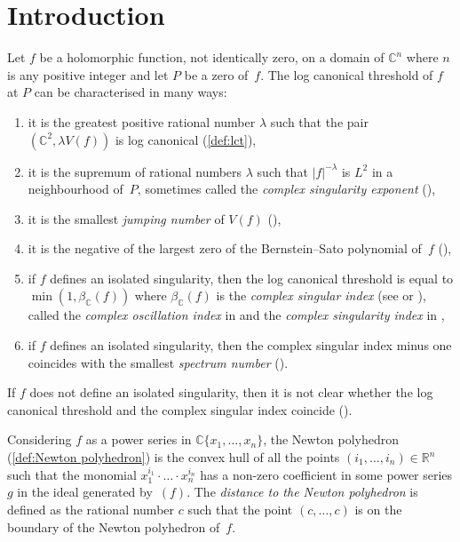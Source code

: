 \documentclass[a4paper, 12pt, oneside]{article}
\theoremstyle{plain}
\theoremstyle{definition}
\theoremstyle{remark}
\numberwithin{theorem}{section}
\numberwithin{table}{section}
\numberwithin{equation}{theorem}
\newcommand*\abs[1]{\left\lvert #1 \right\rvert}
\begin{document}
\section{Introduction}

Let $f$ be a holomorphic function, not identically zero, on a domain of $\mathbb C^n$ where $n$ is any positive integer and let $P$ be a zero of~$f$. The log canonical threshold of $f$ at $P$ can be characterised in many ways:
\begin{enumerate}[label=(\arabic*), ref=\arabic*]
\item it is the greatest positive rational number $\lambda$ such that the pair $(\mathbb C^2, \lambda V(f))$ is log canonical (\cref{def:lct}),
\item it is the supremum of rational numbers $\lambda$ such that $\abs{f}^{-\lambda}$ is $L^2$ in a neighbourhood of~$P$, sometimes called the \emph{complex singularity exponent} (\cite[Definition~8.4]{KK13}),
\item it is the smallest \emph{jumping number} of $V(f)$ (\cite[Definition~9.3.22]{Laz04b}),
\item it is the negative of the largest zero of the Bernstein--Sato polynomial of~$f$ (\cite[Theorem~10.6]{Kol97}),
\item if $f$ defines an isolated singularity, then the log canonical threshold is equal to $\min(1, \beta_\mathbb C(f))$ where $\beta_\mathbb C(f)$ is the \emph{complex singular index} (see \cite[Section~4]{Var82} or \cite[Theorem~9.5]{Kol97}), called the \emph{complex oscillation index} in \cite[13.1.5]{AGZV12b} and the \emph{complex singularity index} in \cite{Ste85},
\item if $f$ defines an isolated singularity, then the complex singular index minus one coincides with the smallest \emph{spectrum number} (\cite[p~558]{Ste85}).
\end{enumerate}
If $f$ does not define an isolated singularity, then it is not clear whether the log canonical threshold and the complex singular index coincide (\cite[9.6]{Kol97}).

Considering $f$ as a power series in $\mathbb C\{x_1, \ldots, x_n\}$, the Newton polyhedron (\cref{def:Newton polyhedron}) is the convex hull of all the points $(i_1, \ldots, i_n) \in \mathbb R^n$ such that the monomial $x_1^{i_1} \cdot \ldots \cdot x_n^{i_n}$ has a non-zero coefficient in some power series $g$ in the ideal generated by~$(f)$. The \emph{distance to the Newton polyhedron} is defined as the rational number $c$ such that the point $(c, \ldots, c)$ is on the boundary of the Newton polyhedron of~$f$.
\end{document}
